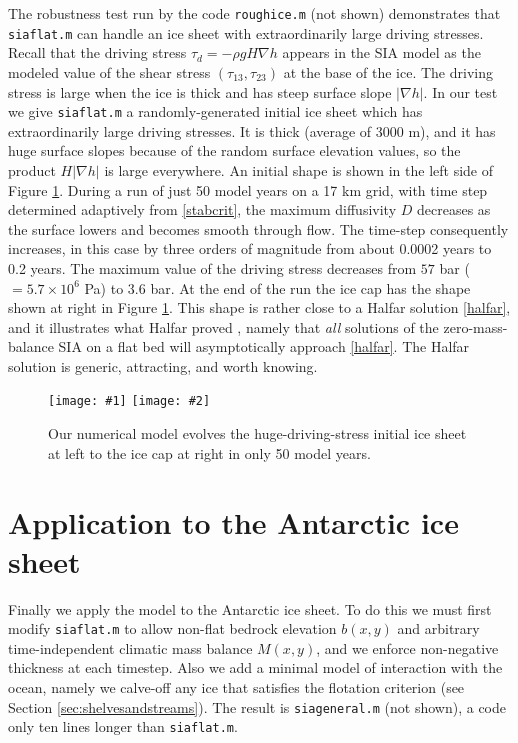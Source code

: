 \documentclass[letterpaper,final,12pt,reqno]{amsart}
\newcommand{\grad}{\nabla}
\newcommand{\twofigsizes}[5]{
\begin{figure}[ht]
\centering
\texttt{[image: \#1]} \quad
\texttt{[image: \#2]}
\caption{#3}
\label{fig:#1}
\end{figure}}
\begin{document}
The robustness test run by the code \texttt{roughice.m} (not shown) demonstrates that \texttt{siaflat.m} can handle an ice sheet with extraordinarily large driving stresses.  Recall that the driving stress $\tau_d = - \rho g H \grad h$ appears in the SIA model as the modeled value of the shear stress $(\tau_{13},\tau_{23})$ at the base of the ice.  The driving stress is large when the ice is thick and has steep surface slope $|\nabla h|$.  In our test we give \texttt{siaflat.m} a randomly-generated initial ice sheet which has extraordinarily large driving stresses.  It is thick (average of 3000 m), and it has huge surface slopes because of the random surface elevation values, so the product $H|\grad h|$ is large everywhere.  An initial shape is shown in the left side of Figure \ref{fig:roughinitial}.  During a run of just 50 model years on a 17 km grid, with time step determined adaptively from \eqref{stabcrit}, the maximum diffusivity $D$ decreases as the surface lowers and becomes smooth through flow.  The time-step consequently increases, in this case by three orders of magnitude from about 0.0002 years to 0.2 years.  The maximum value of the driving stress decreases from $57$ bar ($= 5.7\times 10^6$ Pa) to $3.6$ bar.  At the end of the run the ice cap has the shape shown at right in Figure \ref{fig:roughinitial}.  This shape is rather close to a Halfar solution \eqref{halfar}, and it illustrates what Halfar proved \cite{Halfar81,Halfar83}, namely that \emph{all} solutions of the zero-mass-balance SIA on a flat bed will asymptotically approach \eqref{halfar}.  The Halfar solution is generic, attracting, and worth knowing.

\twofigsizes{roughinitial}{roughfinal}{Our numerical model evolves the huge-driving-stress initial ice sheet at left to the ice cap at right in only 50 model years.}{2.9in}{2.9in}


\section{Application to the Antarctic ice sheet}   \label{sec:antapp}

Finally we apply the model to the Antarctic ice sheet.  To do this we must first modify \texttt{siaflat.m} to allow non-flat bedrock elevation $b(x,y)$ and arbitrary time-independent climatic mass balance $M(x,y)$, and we enforce non-negative thickness at each timestep.  Also we add a minimal model of interaction with the ocean, namely we calve-off any ice that satisfies the flotation criterion (see Section \ref{sec:shelvesandstreams}).  The result is \texttt{siageneral.m} (not shown), a code only ten lines longer than \texttt{siaflat.m}.
\end{document}
